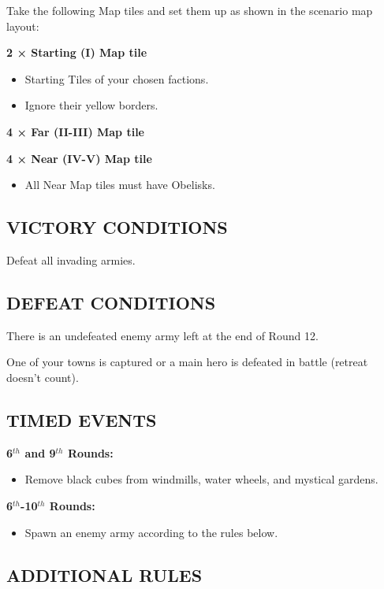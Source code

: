 \begin{multicols*}{2}
Take the following Map tiles and set them up as shown in the scenario map layout:

\textbf{2 × Starting (I) Map tile}
\begin{itemize}
  \item Starting Tiles of your chosen factions.
  \item Ignore their yellow borders.
\end{itemize}

\textbf{4 × Far (II-III) Map tile}

\textbf{4 × Near (IV-V) Map tile}
\begin{itemize}
  \item All Near Map tiles must have Obelisks.
\end{itemize}

\subsection*{\MakeUppercase{Victory Conditions}}

Defeat all invading armies.

\subsection*{\MakeUppercase{Defeat Conditions}}

There is an undefeated enemy army left at the end of Round 12.

One of your towns is captured or a main hero is defeated in battle (retreat doesn't count).

\subsection*{\MakeUppercase{Timed Events}}

\textbf{6$^{th}$ and 9$^{th}$ Rounds:}
\begin{itemize}
  \item Remove black cubes from windmills, water wheels, and mystical gardens.
\end{itemize}

\textbf{6$^{th}$-10$^{th}$ Rounds:}
\begin{itemize}
  \item Spawn an enemy army according to the rules below.
\end{itemize}

\subsection*{\MakeUppercase{Additional Rules}}


\end{multicols*}
